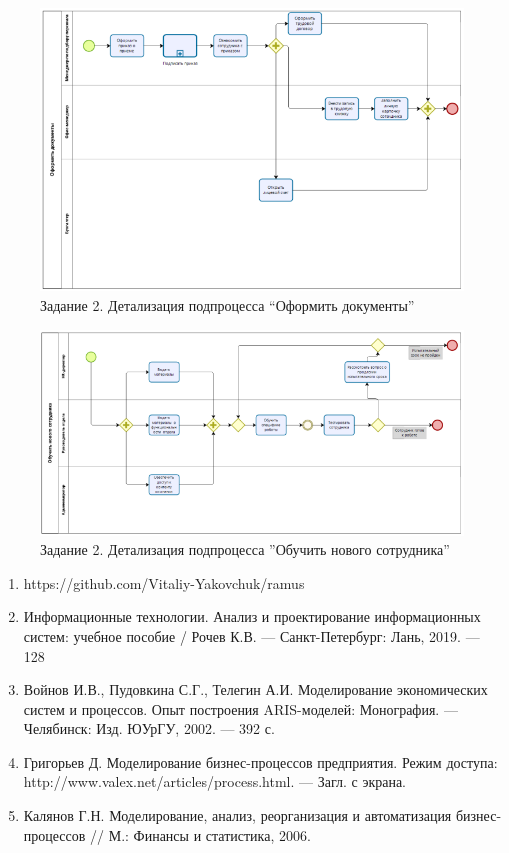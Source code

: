 \documentclass[a4paper,14pt]{extarticle}
\begin{document}
	\begin{figure}[htpb]
	\centering
	\includegraphics[width=0.6\linewidth]{images/pr10-emp3}
	\caption{Задание 2. Детализация подпроцесса “Оформить документы”}
	\label{fig:pr10-emp3}
\end{figure}
	\begin{figure}[htpb]
	\centering
	\includegraphics[width=0.7\linewidth]{images/pr10-emp4}
	\caption{Задание 2. Детализация подпроцесса ”Обучить нового сотрудника”}
	\label{fig:pr10-emp4}
\end{figure}
\hfill
\newpage
{}
\begin{enumerate}
	\item https://github.com/Vitaliy-Yakovchuk/ramus
	\item Информационные технологии. Анализ и проектирование информационных систем: учебное пособие / Рочев К.В. --- Санкт-Петербург: Лань, 2019. --- 128

	
	\item Войнов И.В., Пудовкина С.Г., Телегин А.И. Моделирование экономических систем и процессов. Опыт построения ARIS-моделей: Монография. --- Челябинск: Изд. ЮУрГУ, 2002. --- 392 с.
	
	
	\item Григорьев Д. Моделирование бизнес-процессов предприятия. Режим доступа: http://www.valex.net/articles/process.html. --- Загл. с экрана.
	
	\item Калянов Г.Н. Моделирование, анализ, реорганизация и автоматизация бизнес-процессов // М.: Финансы и статистика, 2006.
\end{enumerate}


\end{document}
